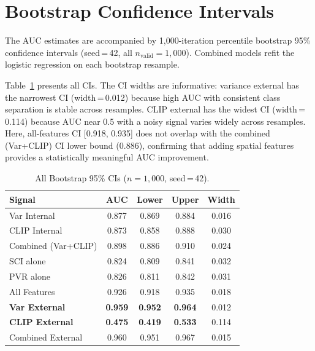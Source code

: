\documentclass[conference]{IEEEtran}
\begin{document}
\section{Bootstrap Confidence Intervals}
\label{sec:bootstrap}

The AUC estimates are accompanied by 1{,}000-iteration percentile
bootstrap 95\% confidence intervals (seed\,=\,42, all
$n_{\text{valid}}{=}1{,}000$). Combined models refit the logistic
regression on each bootstrap resample.

Table~\ref{tab:ci} presents all CIs. The CI widths are informative:
variance external has the narrowest CI (width\,=\,0.012) because
high AUC with consistent class separation is stable across
resamples. CLIP external has the widest CI (width\,=\,0.114)
because AUC near 0.5 with a noisy signal varies widely across
resamples. Here, all-features CI [0.918, 0.935] does not overlap
with the combined (Var+CLIP) CI lower bound (0.886), confirming that
adding spatial features provides a statistically meaningful AUC
improvement.

\begin{table}[h]
\centering
\caption{All Bootstrap 95\% CIs ($n{=}1{,}000$, seed\,=\,42).}
\label{tab:ci}
\small
\begin{tabular}{lcccc}
\toprule
\textbf{Signal} & \textbf{AUC} & \textbf{Lower} & \textbf{Upper} & \textbf{Width} \\
\midrule
Var Internal       & 0.877 & 0.869 & 0.884 & 0.016 \\
CLIP Internal      & 0.873 & 0.858 & 0.888 & 0.030 \\
Combined (Var+CLIP)& 0.898 & 0.886 & 0.910 & 0.024 \\
SCI alone          & 0.824 & 0.809 & 0.841 & 0.032 \\
PVR alone          & 0.826 & 0.811 & 0.842 & 0.031 \\
All Features       & 0.926 & 0.918 & 0.935 & 0.018 \\
\midrule
\textbf{Var External}  & \textbf{0.959} & \textbf{0.952} & \textbf{0.964} & 0.012 \\
\textbf{CLIP External} & \textbf{0.475} & \textbf{0.419} & \textbf{0.533} & 0.114 \\
Combined External  & 0.960 & 0.951 & 0.967 & 0.015 \\
\bottomrule
\end{tabular}
\end{table}
\end{document}
